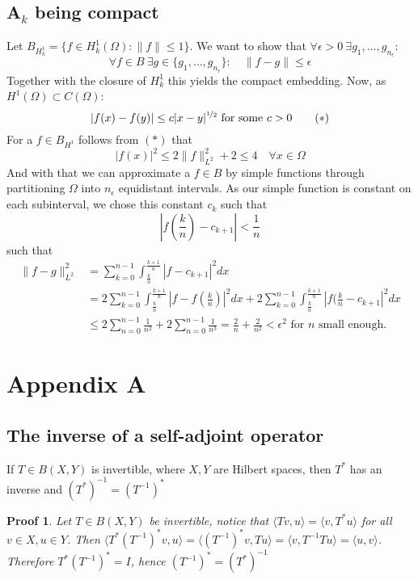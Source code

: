 \documentclass[14pt,a4paper]{scrartcl}
\newtheorem*{proof*}{Proof}
\numberwithin{equation}{section}
\begin{document}
\subsection{A$_{k}$ being compact}
Let $B_{H^{1}_{k}} = \{ f \in H^{1}_{k}(\Omega) : \| f \| \leq 1 \}$. We want to show that $\forall \epsilon > 0 ~\exists g_{1}, \dotsc, g_{n_{\epsilon}}$:
	\[ \forall f \in B ~\exists g \in \{ g_{1}, \dotsc, g_{n_{\epsilon}} \} : \quad \| f - g \| \leq \epsilon \]
Together with the closure of $H^{1}_{k}$ this yields the compact embedding. Now, as $H^1(\Omega) \subset C(\Omega)$: 
	\[ |f(x) - f(y)| \leq c |x - y|^{\nicefrac{1}{2}} \text{ for some } c > 0 \tag*{$(*)$} \]
For a $f \in B_{H^{1}}$ follows from $(*)$ that 
	\[ |f(x)|^{2} \leq 2 \| f \|^{2}_{L^{2}} + 2 \leq 4 \quad \forall x \in \Omega \]
And with that we can approximate a $f \in B$ by simple functions through partitioning $\Omega$ into $n_{\epsilon}$ equidistant intervals. As our simple function is constant on each subinterval, we chose this constant $c_{k}$ such that
	\[ |f(\frac{k}{n}) - c_{k + 1}| < \frac{1}{n}  \]
such that
\begin{align*}
	\| f - g \|^{2}_{L^{2}} & = \sum_{k = 0}^{n-1} \int_{\frac{k}{n}}^{\frac{k+1}{n}} | f - c_{k+1} |^{2} dx \\
		& =  2 \sum_{k = 0}^{n-1} \int_{\frac{k}{n}}^{\frac{k+1}{n}} | f - f(\frac{k}{n}) |^{2} dx +  2 \sum_{k = 0}^{n-1} \int_{\frac{k}{n}}^{\frac{k+1}{n}} | f(\frac{k}{n} - c_{k+1} |^{2} dx \\
		& \leq 2 \sum_{n = 0}^{n-1} \frac{1}{n^{2}} + 2 \sum_{n=0}^{n-1} \frac{1}{n^{3}} = \frac{2}{n} + \frac{2}{n^{2}} < \epsilon^{2} \text{ for } n \text{ small enough.}
\end{align*}

\newpage

\section{Appendix A}


\subsection{The inverse of a self-adjoint operator} %
If $T \in B(X, Y)$ is invertible, where $X, Y$ are Hilbert spaces, then $T^{*}$ has an inverse and $(T^{*})^{-1} = (T^{-1})^{*}$

\begin{proof*}
	Let $T \in B(X, Y)$ be invertible, notice that $\langle Tv , u \rangle = \langle v , T^{*} u \rangle$ for all $v \in X, u \in Y$. Then $\langle T^{*} (T^{-1})^{*}v, u \rangle = \langle (T^{-1})^{*} v, T u \rangle = \langle v , T^{-1} T u \rangle = \langle u, v \rangle$. \\
	Therefore $T^{*} (T^{-1})^{*} = I$, hence $(T^{-1})^{*} = (T^{*})^{-1}$
\end{proof*}
\end{document}
